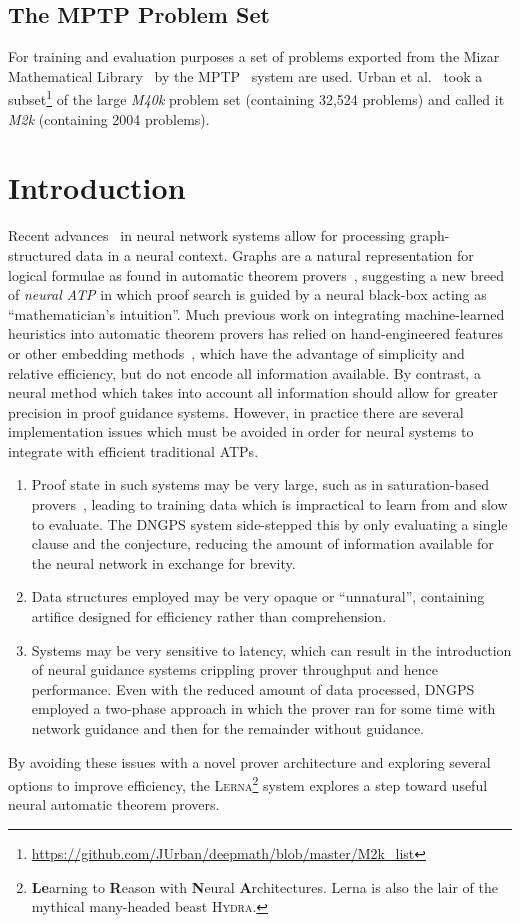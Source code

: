 \documentclass[runningheads]{llncs}
\newcommand{\lerna}{\textsc{Lerna}}
\newcommand{\mizarlarge}{\textit{M40k}}
\newcommand{\mizarsmall}{\textit{M2k}}
\begin{document}
\subsection{The MPTP Problem Set}
For training and evaluation purposes a set of problems exported from the Mizar Mathematical Library~\cite{mizar} by the MPTP~\cite{MPTP} system are used.
Urban et al.~\cite{rlCoP} took a subset\footnote{\url{https://github.com/JUrban/deepmath/blob/master/M2k_list}} of the large \mizarlarge{} problem set (containing 32,524 problems) and called it \mizarsmall{} (containing 2004 problems).

\section{Introduction}
Recent advances~\cite{graph-cnn,gcn,gcn-relational} in neural network systems allow for processing graph-structured data in a neural context.
Graphs are a natural representation for logical formulae as found in automatic theorem provers~\cite{formula-graph}, suggesting a new breed of \emph{neural ATP} in which proof search is guided by a neural black-box acting as ``mathematician's intuition''.
Much previous work on integrating machine-learned heuristics into automatic theorem provers has relied on hand-engineered features~\cite{MaLeCoP,FEMaLeCoP,rlCoP} or other embedding methods~\cite{ENIGMA}, which have the advantage of simplicity and relative efficiency, but do not encode all information available.
By contrast, a neural method which takes into account all information should allow for greater precision in proof guidance systems.
However, in practice there are several implementation issues which must be avoided in order for neural systems to integrate with efficient traditional ATPs.
\begin{enumerate}
	\item Proof state in such systems may be very large, such as in saturation-based provers~\cite{Vampire}, leading to training data which is impractical to learn from and slow to evaluate. The DNGPS system side-stepped this by only evaluating a single clause and the conjecture, reducing the amount of information available for the neural network in exchange for brevity.
	\item Data structures employed may be very opaque or ``unnatural'', containing artifice designed for efficiency rather than comprehension.
	\item Systems may be very sensitive to latency, which can result in the introduction of neural guidance systems crippling prover throughput and hence performance. Even with the reduced amount of data processed, DNGPS employed a two-phase approach in which the prover ran for some time with network guidance and then for the remainder without guidance.
\end{enumerate}
%
By avoiding these issues with a novel prover architecture and exploring several options to improve efficiency, the \lerna{}\footnote{\textbf{Le}arning to \textbf{R}eason with \textbf{N}eural \textbf{A}rchitectures. Lerna is also the lair of the mythical many-headed beast \textsc{Hydra}.} system explores a step toward useful neural automatic theorem provers.
\end{document}
